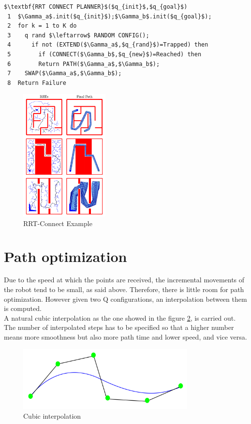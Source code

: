 \begin{lstlisting}[frame=tb, mathescape=true,xleftmargin=.13\textwidth, xrightmargin=.13\textwidth]
$\textbf{RRT CONNECT PLANNER}$($q_{init}$,$q_{goal}$)
 1  $\Gamma_a$.init($q_{init}$);$\Gamma_b$.init($q_{goal}$);
 2  for k = 1 to K do
 3    q rand $\leftarrow$ RANDOM CONFIG();
 4      if not (EXTEND($\Gamma_a$,$q_{rand}$)=Trapped) then
 5        if (CONNECT($\Gamma_b$,$q_{new}$)=Reached) then
 6        Return PATH($\Gamma_a$,$\Gamma_b$);
 7    SWAP($\Gamma_a$,$\Gamma_b$);
 8  Return Failure
\end{lstlisting}

\begin{figure}[!ht]
	\centering
	\includegraphics[width=0.4\textwidth]{figures/rrt_connect}
	\caption{RRT-Connect Example}
	\label{fig:rrt_connect}
\end{figure}

\section{Path optimization} %
\label{sec:path_optimization}
Due to the speed at which the points are received, the incremental movements of the robot tend to be small, as said above. Therefore, there is little room for path optimization. However given two Q configurations, an interpolation between them is computed.\\

A natural cubic interpolation as the one showed in the figure \ref{fig:cubic interpolation}, is carried out. The number of interpolated steps has to be specified so that a higher number means more smoothness but also more path time and lower speed, and vice versa.

\begin{figure}[!hb]
	\centering
	\includegraphics[width=0.8\textwidth]{figures/cubic_interpolation}
	\caption{Cubic interpolation}
	\label{fig:cubic interpolation}
\end{figure}

